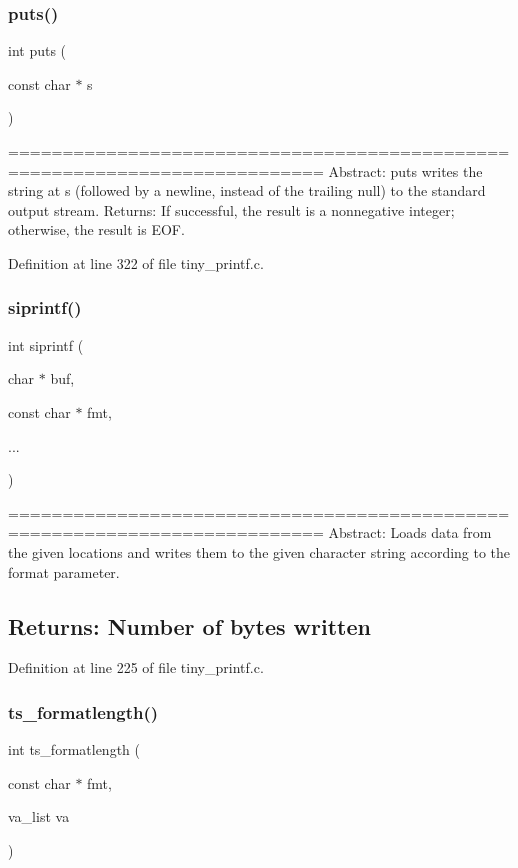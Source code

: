 \subsubsection{puts()}
{\footnotesize\ttfamily int puts (\begin{DoxyParamCaption}\item[{const char $\ast$}]{s }\end{DoxyParamCaption})}

=========================================================================== Abstract\+: puts writes the string at s (followed by a newline, instead of the trailing null) to the standard output stream. Returns\+: If successful, the result is a nonnegative integer; otherwise, the result is E\+OF. 

 

Definition at line 322 of file tiny\+\_\+printf.\+c.

\mbox{\label{tiny__printf_8c_a3361dee588706116cc559feb3e8aa295}} 
\subsubsection{siprintf()}
{\footnotesize\ttfamily int siprintf (\begin{DoxyParamCaption}\item[{char $\ast$}]{buf,  }\item[{const char $\ast$}]{fmt,  }\item[{}]{... }\end{DoxyParamCaption})}

=========================================================================== Abstract\+: Loads data from the given locations and writes them to the given character string according to the format parameter. \subsection*{Returns\+: Number of bytes written }

Definition at line 225 of file tiny\+\_\+printf.\+c.

\mbox{\label{tiny__printf_8c_a37c0a321987f1cacc976e3153110694a}} 
\subsubsection{ts\+\_\+formatlength()}
{\footnotesize\ttfamily int ts\+\_\+formatlength (\begin{DoxyParamCaption}\item[{const char $\ast$}]{fmt,  }\item[{va\+\_\+list}]{va }\end{DoxyParamCaption})}



